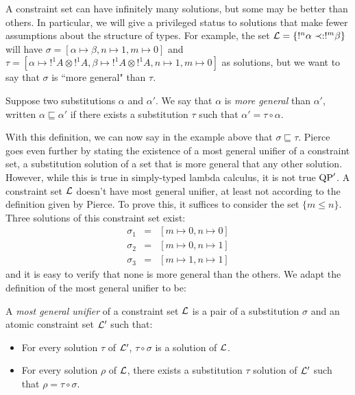 A constraint set can have infinitely many solutions, but some may be better than others. In particular, we will give a privileged status to solutions
that make fewer assumptions about the structure of types. For example, the set $\mathcal{L} = \{!^n \alpha \prec: !^m \beta\}$ will have
$\sigma = [\alpha \mapsto \beta, n \mapsto 1, m \mapsto 0]$ and $\tau = [\alpha \mapsto {!}^1 A \otimes {!}^1 A, \beta \mapsto {!}^1 A \otimes {!}^1 A,
n \mapsto 1, m \mapsto 0]$ as solutions, but we want to say that $\sigma$ is ``more general" than $\tau$.

\begin{defn} Suppose two substitutions $\alpha$ and $\alpha'$. We say that $\alpha$ is \textit{more general} than $\alpha'$, written
	$\alpha \sqsubseteq \alpha'$ if there exists a substitution $\tau$ such that $\alpha' = \tau \circ \alpha$.
\end{defn}

With this definition, we can now say in the example above that $\sigma \sqsubseteq \tau$. Pierce {\cite{pierce02}} goes even further by stating the existence
of a most general unifier of a constraint set, a substitution solution of a set that is more general that any other solution. However,
while this is true in simply-typed lambda calculus, it is not true ${\rm QP}'$. A constraint set $\mathcal{L}$ doesn't have  most general unifier, at least not according to the definition given
by Pierce. To prove this, it suffices to consider the set $\{ m \le n \}$. Three solutions of this constraint set exist:
	$$ \begin{array}{ccl}
		   \sigma_1 & = & [m \mapsto 0, n \mapsto 0] \\
			 \sigma_2 & = & [m \mapsto 0, n \mapsto 1] \\
			 \sigma_3 & = & [m \mapsto 1, n \mapsto 1]
			\end{array} $$
and it is easy to verify that none is more general than the others.
We adapt the definition of the most general unifier to be:

\begin{defn} A \textit{most general unifier} of a constraint set $\mathcal{L}$ is a pair of a substitution $\sigma$ and an atomic
	constraint set $\mathcal{L}'$ such that:
		\begin{itemize}
			\item For every solution $\tau$ of $\mathcal{L}	'$, $\tau \circ \sigma$ is a solution of $\mathcal{L}$.
			\item For every solution $\rho$ of $\mathcal{L}$, there exists a substitution $\tau$ solution of $\mathcal{L}'$ such that $\rho = \tau \circ \sigma$.
		\end{itemize}
\end{defn}

